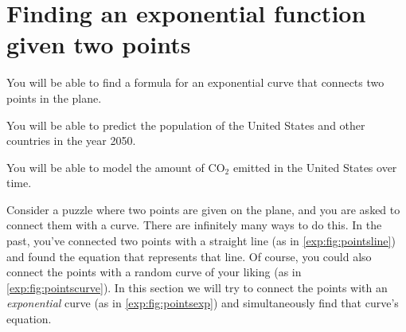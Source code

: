 \section{Finding an exponential function given two points}\label{exp:sec:findformula}
\begin{outcomes}
	\begin{outcomelist}
		\item You will be able to find a formula for an exponential curve that connects two points in the plane. 
		\item You will be able to predict the population of the United States and other countries in the year 2050.
		\item You will be able to model the amount of $\mathrm{CO}_2$ emitted in the United States over time.
	\end{outcomelist}
\end{outcomes}
Consider a puzzle where two points are given on the plane, and you are asked to connect them with a curve.  
There are infinitely many ways to do this.  In the past, you've connected two points with a straight 
line (as in \cref{exp:fig:pointsline}) and found the equation that represents that line.  Of course, you 
could also connect the points with a random curve of your liking (as in \cref{exp:fig:pointscurve}).  
In this section we will try to connect the points with an \emph{exponential} 
curve (as in \cref{exp:fig:pointsexp}) and simultaneously find that curve's equation. 
			
